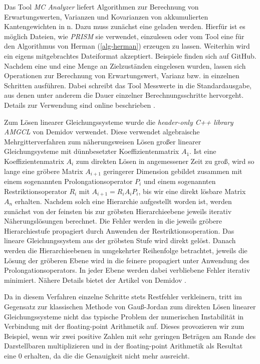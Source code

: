 \documentclass[a4paper]{article}
\theoremstyle{nonumberplain}
\begin{document}
Das Tool \textit{MC Analyzer} \cite{MCA} liefert Algorithmen zur Berechnung von Erwartungswerten, Varianzen und Kovarianzen von akkumulierten Kantengewichten in \mc n.
Dazu muss zunächst eine \mc{} geladen werden. Hierfür ist es möglich Dateien, wie \textit{PRISM} \cite{PRISMCS} sie verwendet, einzulesen oder vom Tool eine \mc{} für den Algorithmus von Herman (\ref{alg-herman}) erzeugen zu lassen. Weiterhin wird ein eigens mitgebrachtes Dateiformat akzeptiert. Beispiele finden sich auf GitHub. Nachdem eine \mc{} und eine Menge an Zielzuständen eingelesen wurden, lassen sich Operationen zur Berechnung von Erwartungswert, Varianz bzw. \cov{} in einzelnen Schritten ausführen. Dabei schreibt das Tool Messwerte in die Standardausgabe, aus denen unter anderem die Dauer einzelner Berechnungsschritte hervorgeht. Details zur Verwendung sind online beschrieben \cite{MCA}.


Zum Lösen linearer Gleichungssysteme wurde die \textit{header-only C++ library AMGCL} von Demidov \cite{Demidov2019} verwendet. Diese verwendet algebraische Mehrgitterverfahren zum näherungsweisen Lösen großer linearer Gleichungsysteme mit dünnbesetzter Koeffizientenmatrix $A_1$. 
Ist eine Koeffizientenmatrix $A_i$ zum direkten Lösen in angemessener Zeit zu groß, wird so lange eine gröbere Matrix $A_{i+1}$ geringerer Dimension gebildet zusammen mit einem sogenannten Prolongationsoperator $P_i$ und einem sogenannten Restriktionsoperator $R_i$ mit $A_{i+1} = R_iA_iP_i$, bis wir eine direkt lösbare Matrix $A_n$ erhalten. Nachdem solch eine Hierarchie aufgestellt worden ist, werden zunächst von der feinsten bis zur gröbsten Hierarchieebene jeweils iterativ Näherungslösungen berechnet. Die Fehler werden in die jeweils gröbere Hierarchiestufe propagiert durch Anwenden der Restriktionsoperation. Das lineare Gleichungssystem aus der gröbsten Stufe wird direkt gelöst. Danach werden die Hierarchieebenen in umgekehrter Reihenfolge betrachtet, jeweils die Lösung der gröberen Ebene wird in die feinere propagiert unter Anwendung des Prolongationsoperators. In jeder Ebene werden dabei verbliebene Fehler iterativ minimiert. Nähere Details bietet der Artikel von Demidov \cite{Demidov2019}.

Da in diesem Verfahren einzelne Schritte stets Restfehler verkleinern, tritt im Gegensatz zur klassischen Methode von Gauß-Jordan zum direkten Lösen linearer Gleichungssysteme nicht das typische Problem der numerischen Instabilität in Verbindung mit der floating-point Arithmetik auf. Dieses provozieren wir zum Beispiel, wenn wir zwei positive Zahlen mit sehr geringen Beträgen am Rande des Darstellbaren multiplizieren und in der floating-point Arithmetik als Resultat eine $0$ erhalten, da die die Genauigkeit nicht mehr ausreicht.
\end{document}
